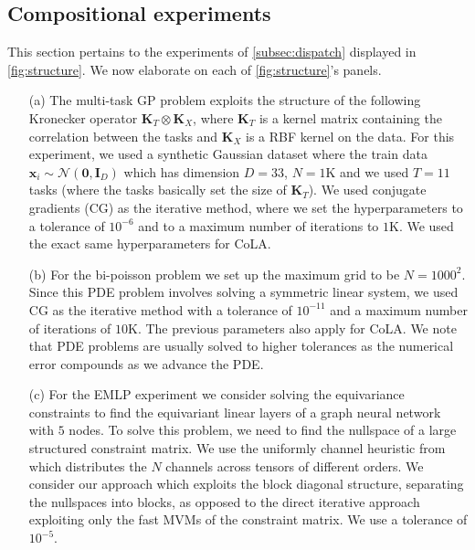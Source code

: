 \documentclass{article}
\newcommand{\mbf}[1]{{\boldsymbol{\mathbf{#1}}}}
\renewcommand{\bm}{\mbf}
\begin{document}
\subsection{Compositional experiments} \label{app:compositional-exps}
This section pertains to the experiments of \autoref{subsec:dispatch}
displayed in \autoref{fig:structure}.
We now elaborate on each of \autoref{fig:structure}'s panels.
\begin{enumerate}
    \item[(a)]
    The multi-task GP problem exploits the structure
    of the following Kronecker operator $\bm{K}_T \otimes \bm{K}_X$,
    where $\bm{K}_{T}$ is a kernel matrix containing the correlation between the tasks and $\bm{K}_{X}$ is a RBF kernel on the data.
    For this experiment, we used a synthetic Gaussian dataset
    where the train data $\bm{x}_i \sim \mathcal{N}(\bm{0}, \bm{I}_D)$
    which has dimension $D=33$, $N=1$K and we used $T=11$ tasks (where the tasks basically set the size of $\bm{K}_T$).
    We used conjugate gradients (CG) as the iterative method,
    where we set the hyperparameters to a tolerance of $10^{-6}$ and
    to a maximum number of iterations to $1$K.
    We used the exact same hyperparameters for CoLA.

    \item[(b)]
    For the bi-poisson problem we set up the maximum grid to be $N=1000^2$.
    Since this PDE problem involves solving a symmetric linear system, we used
    CG as the iterative method with a tolerance of
    $10^{-11}$ and a maximum number of iterations of $10$K.
    The previous parameters also apply for CoLA.
    We note that PDE problems are usually solved to higher tolerances as
    the numerical error compounds as we advance the PDE.

    \item[(c)]
    For the EMLP experiment we consider solving the equivariance constraints to find the equivariant linear layers of a graph neural network with $5$ nodes. To solve this problem, we need to find the nullspace of a large structured constraint matrix. We use the uniformly channel heuristic from \citep{finzi2021practical} which distributes the $N$ channels across tensors of different orders. We consider our approach which exploits the block diagonal structure, separating the nullspaces into blocks, as opposed to the direct iterative approach exploiting only the fast MVMs of the constraint matrix. We use a tolerance of $10^{-5}$.
\end{enumerate}
\end{document}
